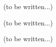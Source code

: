 


(to be written...)






(to be written...)



(to be written...)

\begin{appendices}
\end{appendices}

